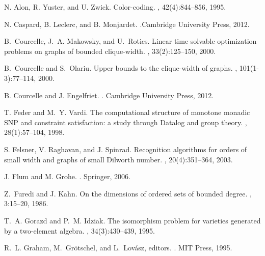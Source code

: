 \documentclass[usletter]{article}
\newcommand{\shortversion}[1]{}
\begin{document}
\begin{thebibliography}{10}
\shortversion{\softraggedright}

N. Alon, R. Yuster, and U. Zwick.
\newblock Color-coding.
, 42(4):844--856, 1995.



N. Caspard, B. Leclerc, and B. Monjardet.
.\newblock Cambridge University Press, 2012.



B.~Courcelle, J.~A. Makowsky, and U.~Rotics.
\newblock Linear time solvable optimization problems on graphs of bounded
  clique-width.
, 33(2):125--150, 2000.

B.~Courcelle and S.~Olariu.
\newblock Upper bounds to the clique-width of graphs.
, 101(1-3):77--114, 2000.

B. Courcelle and J. Engelfriet.
.
\newblock Cambridge University Press, 2012.

T. Feder and M.~Y. Vardi.
\newblock The computational structure of monotone monadic {SNP} and constraint
  satisfaction: a study through {D}atalog and group theory.
, 28(1):57--104, 1998.

S. Felsner, V. Raghavan, and J. Spinrad.
\newblock Recognition algorithms for orders of small width and graphs of small
  Dilworth number.
, 20(4):351--364, 2003.

J. Flum and M. Grohe.
.
\newblock Springer, 2006.

Z.~Furedi and J. Kahn.
\newblock On the dimensions of ordered sets of bounded degree.
, 3:15--20, 1986.

T.~A. Gorazd and P.~M. Idziak.
\newblock The isomorphism problem for varieties generated by a two-element
  algebra.
, 34(3):430--439, 1995.

R.~L. Graham, M.~Gr\"{o}tschel, and L.~Lov\'{a}sz, editors.
.
\newblock MIT Press, 1995.


\end{thebibliography}
\end{document}
